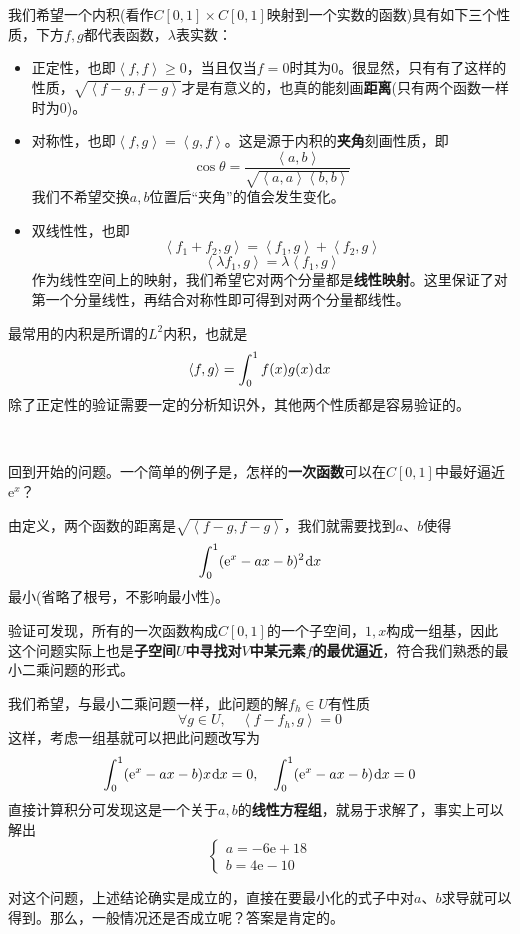 \documentclass[a4paper,UTF8,fontset=windows,AutoFakeBold]{ctexart}
\newcommand*{\dr}{\hspace{0.07em}\mathrm{d}}
\newcommand*{\er}{\mathrm{e}}
\begin{document}
我们希望一个内积(看作$C[0,1]\times C[0,1]$映射到一个实数的函数)具有如下三个性质，下方$f,g$都代表函数，$\lambda$表实数：
\begin{itemize}
    \item 正定性，也即$\left<f,f\right>\ge0$，当且仅当$f=0$时其为0。很显然，只有有了这样的性质，$\sqrt{\left<f-g,f-g\right>}$才是有意义的，也真的能刻画\textbf{距离}(只有两个函数一样时为0)。
    \item 对称性，也即$\left<f,g\right>=\left<g,f\right>$。这是源于内积的\textbf{夹角}刻画性质，即
    $$\cos\theta=\frac{\left<a,b\right>}{\sqrt{\left<a,a\right>\left<b,b\right>}}$$
    我们不希望交换$a,b$位置后``夹角''的值会发生变化。
    \item 双线性性，也即
    $$\left<f_1+f_2,g\right>=\left<f_1,g\right>+\left<f_2,g\right>$$
    $$\left<\lambda f_1,g\right>=\lambda\left<f_1,g\right>$$
    作为线性空间上的映射，我们希望它对两个分量都是\textbf{线性映射}。这里保证了对第一个分量线性，再结合对称性即可得到对两个分量都线性。
\end{itemize}

最常用的内积是所谓的$L^2$内积，也就是
$$\left<f,g\right>=\int_0^1f(x)g(x)\dr x$$
除了正定性的验证需要一定的分析知识外，其他两个性质都是容易验证的。

\

回到开始的问题。一个简单的例子是，怎样的\textbf{一次函数}可以在$C[0,1]$中最好逼近$\er^x$？

由定义，两个函数的距离是$\sqrt{\left<f-g,f-g\right>}$，我们就需要找到$a$、$b$使得
$$\int_0^1(\er^x-ax-b)^2\dr x$$
最小(省略了根号，不影响最小性)。

验证可发现，所有的一次函数构成$C[0,1]$的一个子空间，$1,x$构成一组基，因此这个问题实际上也是\textbf{子空间$U$中寻找对$V$中某元素$f$的最优逼近}，符合我们熟悉的最小二乘问题的形式。

我们希望，与最小二乘问题一样，此问题的解$f_h\in U$有性质
$$\forall g\in U,\quad\left<f-f_h,g\right>=0$$
这样，考虑一组基就可以把此问题改写为
$$\int_0^1(\er^x-ax-b)x\dr x=0,\quad\int_0^1(\er^x-ax-b)\dr x=0$$
直接计算积分可发现这是一个关于$a,b$的\textbf{线性方程组}，就易于求解了，事实上可以解出
$$\begin{cases}a=-6\er+18\\b=4\er-10\end{cases}$$

对这个问题，上述结论确实是成立的，直接在要最小化的式子中对$a$、$b$求导就可以得到。那么，一般情况还是否成立呢？答案是肯定的。
\end{document}
